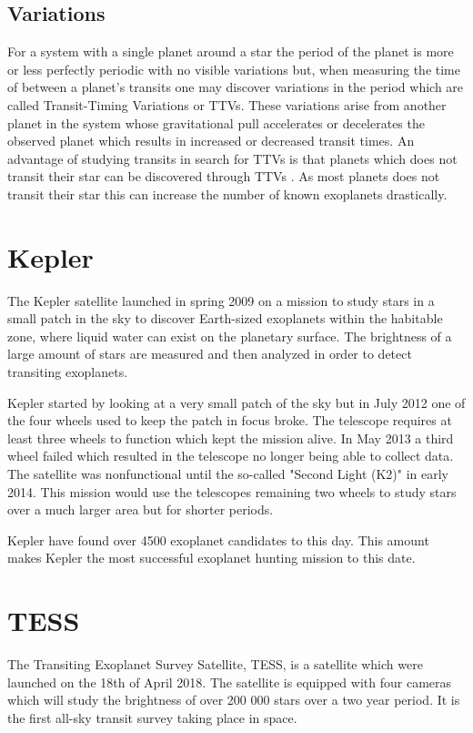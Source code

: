 \documentclass[12pt]{report}
\begin{document}
\subsection{Variations}
\label{sec:trans_vari}

	For a system with a single planet around a star the period of the planet is more or less perfectly periodic with no visible variations but, when measuring the time of between a planet's transits one may discover variations in the period which are called Transit-Timing Variations or TTVs. These variations arise from another planet in the system whose gravitational pull accelerates or decelerates the observed planet which results in increased or decreased transit times. An advantage of studying transits in search for TTVs is that planets which does not transit their star can be discovered through TTVs \citep{0004-637X-777-1-3}. As most planets does not transit their star this can increase the number of known exoplanets drastically.

\section{Kepler}
	The Kepler satellite launched in spring 2009 on a mission to study stars in a small patch in the sky to discover Earth-sized exoplanets within the habitable zone, where liquid water can exist on the planetary surface. The brightness of a large amount of stars are measured and then analyzed in order to detect transiting exoplanets. 
	
	Kepler started by looking at a very small patch of the sky but in July 2012 one of the four wheels used to keep the patch in focus broke. The telescope requires at least three wheels to function which kept the mission alive. In May 2013 a third wheel failed which resulted in the telescope no longer being able to collect data. The satellite was nonfunctional until the so-called "Second Light (K2)" in early 2014. This mission would use the telescopes remaining two wheels to study stars over a much larger area but for shorter periods. \citep{2017PAPhS.161...38B}
	
	Kepler have found over 4500 exoplanet candidates \citep{2017PAPhS.161...38B} to this day. This amount makes Kepler the most successful exoplanet hunting mission to this date.
	
	
\section{TESS}
	The Transiting Exoplanet Survey Satellite, TESS, is a satellite which were launched on the 18th of April 2018. The satellite is equipped with four cameras which will study the brightness of over 200 000 stars over a two year period. It is the first all-sky transit survey taking place in space. \citep{2014SPIE.9143E..20R}
	
\end{document}
